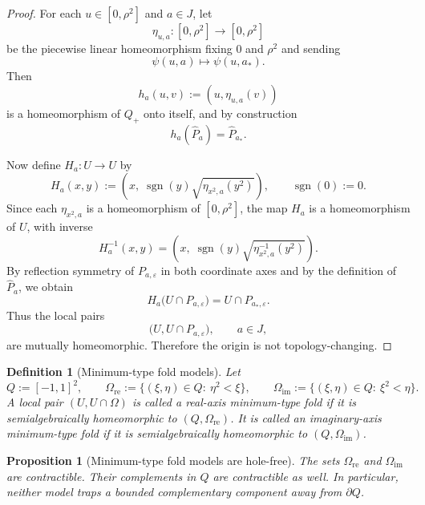 \documentclass[11pt]{article}
\newtheorem{proposition}[theorem]{Proposition}
\newtheorem{definition}[theorem]{Definition}
\begin{document}
\begin{proof}
For each \(u\in[0,\rho^2]\) and \(a\in J\), let
\[
\eta_{u,a}:[0,\rho^2]\to[0,\rho^2]
\]
be the piecewise linear homeomorphism fixing \(0\) and \(\rho^2\) and sending
\[
\psi(u,a)\mapsto \psi(u,a_*).
\]
Then
\[
h_a(u,v):=(u,\eta_{u,a}(v))
\]
is a homeomorphism of \(Q_+\) onto itself, and by construction
\[
h_a(\widehat P_a)=\widehat P_{a_*}.
\]

Now define \(H_a:U\to U\) by
\[
H_a(x,y)
:=
\left(
x,\;
\operatorname{sgn}(y)\sqrt{\eta_{x^2,a}(y^2)}
\right),
\qquad \operatorname{sgn}(0):=0.
\]
Since each \(\eta_{x^2,a}\) is a homeomorphism of \([0,\rho^2]\), the map \(H_a\) is a homeomorphism of \(U\), with inverse
\[
H_a^{-1}(x,y)
=
\left(
x,\;
\operatorname{sgn}(y)\sqrt{\eta_{x^2,a}^{-1}(y^2)}
\right).
\]
By reflection symmetry of \(P_{a,\varepsilon}\) in both coordinate axes and by the definition of \(\widehat P_a\), we obtain
\[
H_a\bigl(U\cap P_{a,\varepsilon}\bigr)=U\cap P_{a_*,\varepsilon}.
\]
Thus the local pairs
\[
\bigl(U,U\cap P_{a,\varepsilon}\bigr),
\qquad a\in J,
\]
are mutually homeomorphic. Therefore the origin is not topology-changing.
\end{proof}

\begin{definition}[Minimum-type fold models]\label{def:min-fold}
Let
\[
Q:=[-1,1]^2,
\qquad
\Omega_{\mathrm{re}}:=\{(\xi,\eta)\in Q:\ \eta^2<\xi\},
\qquad
\Omega_{\mathrm{im}}:=\{(\xi,\eta)\in Q:\ \xi^2<\eta\}.
\]
A local pair \((U,U\cap\Omega)\) is called a \emph{real-axis minimum-type fold} if it is semialgebraically homeomorphic to \((Q,\Omega_{\mathrm{re}})\). It is called an \emph{imaginary-axis minimum-type fold} if it is semialgebraically homeomorphic to \((Q,\Omega_{\mathrm{im}})\).
\end{definition}

\begin{proposition}[Minimum-type fold models are hole-free]\label{prop:min-fold-hole-free}
The sets \(\Omega_{\mathrm{re}}\) and \(\Omega_{\mathrm{im}}\) are contractible. Their complements in \(Q\) are contractible as well. In particular, neither model traps a bounded complementary component away from \(\partial Q\).
\end{proposition}
\end{document}

